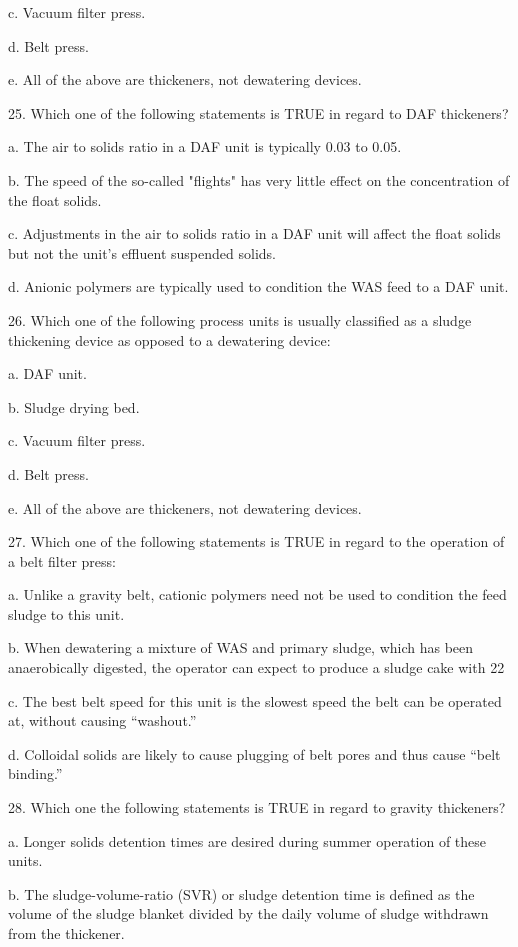 \documentclass{article}
\begin{document}
c. Vacuum filter press. 

d. Belt press. 

e. All of the above are thickeners, not dewatering devices. 


25. Which one of the following statements is TRUE in regard to DAF thickeners? 

a. The air to solids ratio in a DAF unit is typically 0.03 to 0.05. 

b. The speed of the so-called "flights" has very little effect on the concentration of the float solids. 

c. Adjustments in the air to solids ratio in a DAF unit will affect the float solids but not the unit's effluent suspended solids. 

d. Anionic polymers are typically used to condition the WAS feed to a DAF unit. 


26. Which one of the following process units is usually classified as a sludge thickening device as opposed to a dewatering device: 

a. DAF unit. 

b. Sludge drying bed. 

c. Vacuum filter press. 

d. Belt press. 

e. All of the above are thickeners, not dewatering devices. 


27. Which one of the following statements is TRUE in regard to the operation of a belt filter press: 

a. Unlike a gravity belt, cationic polymers need not be used to condition the feed sludge to this unit. 

b. When dewatering a mixture of WAS and primary sludge, which has been anaerobically digested, the operator can expect to produce a sludge cake with 22%

c. The best belt speed for this unit is the slowest speed the belt can be operated at, without causing “washout.” 

d. Colloidal solids are likely to cause plugging of belt pores and thus cause “belt binding.” 


28. Which one the following statements is TRUE in regard to gravity thickeners? 

a. Longer solids detention times are desired during summer operation of these units. 

b. The sludge-volume-ratio (SVR) or sludge detention time is defined as the volume of the sludge blanket divided by the daily volume of sludge withdrawn from the thickener. 
\end{document}
